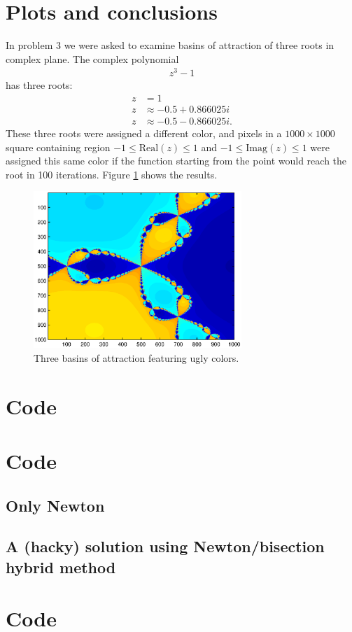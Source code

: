 \documentclass[a4paper,12pt]{scrartcl}
\begin{document}
\section{Plots and conclusions}
In problem 3 we were asked to examine basins of attraction of three roots in complex plane. The complex polynomial
\begin{align*}
z^3-1
\end{align*}
has three roots:
\begin{align*}
z&=1\\
z&\approx-0.5 + 0.866025i\\
z&\approx-0.5 - 0.866025i.
\end{align*}
These three roots were assigned a different color, and pixels in a $1000\times1000$ square containing region $-1\le\text{Real}(z)\le 1$ and $-1\le\text{Imag}(z)\le 1$ were assigned this same color if the function starting from the point would reach the root in 100 iterations. Figure \ref{fig:fractal} shows the results.
\begin{figure}[h!]
  \centering
    \includegraphics[width=0.7\textwidth]{fractal}
  \caption{Three basins of attraction featuring ugly colors.}
  \label{fig:fractal}
\end{figure}
\clearpage

\appendix
\lstset{basicstyle=\ttfamily, numbers=left, numberstyle=\tiny, stepnumber=1, numbersep=5pt}
\gdef\thesection{Appendix \arabic{section}.}
\clearpage

\section{Code\label{LiiteA}}

\clearpage
\section{Code\label{LiiteB}}
\subsection{Only Newton}

\clearpage
\subsection{A (hacky) solution using Newton/bisection hybrid method}

\clearpage
\section{Code\label{LiiteC}}

\end{document}
